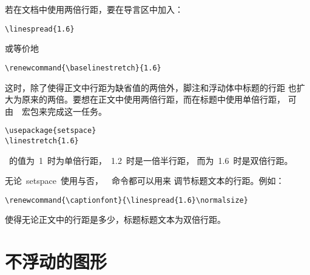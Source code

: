若在文档中使用两倍行距，要在导言区中加入：
\begin{Verbatim}[xleftmargin=1cm]
\linespread{1.6}
\end{Verbatim}
或等价地
\begin{Verbatim}[xleftmargin=1cm]
\renewcommand{\baselinestretch}{1.6}
\end{Verbatim}
这时，除了使得正文中行距为缺省值的两倍外，脚注和浮动体中标题的行距
也扩大为原来的两倍。要想在正文中使用两倍行距，而在标题中使用单倍行距，
可由~~宏包来完成这一任务。
\begin{Verbatim}[xleftmargin=1cm]
\usepackage{setspace} 
\linestretch{1.6}
\end{Verbatim}
~的值为~1~时为单倍行距，~1.2~时是一倍半行距，
而为~1.6~时是双倍行距。

无论~\textsf{setspace}~使用与否，~~命令都可以用来
调节标题文本的行距。例如：
\begin{Verbatim}[xleftmargin=1cm]
\renewcommand{\captionfont}{\linespread{1.6}\normalsize}
\end{Verbatim}
使得无论正文中的行距是多少，标题标题文本为双倍行距。

\section{不浮动的图形}\label{sec:nonfloat}


